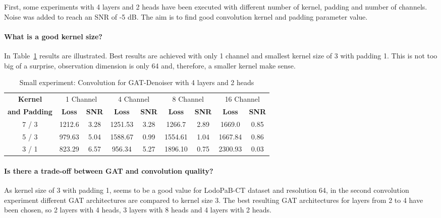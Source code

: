 First, some experiments with 4 layers and 2 heads have been executed with different number of kernel, padding and number of channels.
Noise was added to reach an SNR of -5 dB.
The aim is to find good convolution kernel and padding parameter value.

\paragraph{What is a good kernel size?}

In Table~\ref{tab:small_convolution} results are illustrated. 
Best results are achieved with only 1 channel and smallest kernel size of 3 with padding 1.
This is not too big of a surprise, observation dimension is only 64 and, therefore, a smaller kernel make sense.


\begin{table}[H]
  \centering
  \begin{tabular}{c|cc|cc|cc|cc}
    \toprule
    \textbf{Kernel}  & \multicolumn{2}{c|}{1 Channel} & \multicolumn{2}{c|}{4 Channel} & \multicolumn{2}{c|}{8 Channel} & \multicolumn{2}{c}{16 Channel} \\
    \textbf{and Padding}  & \textbf{Loss} & \textbf{SNR} & \textbf{Loss} & \textbf{SNR} & \textbf{Loss} & \textbf{SNR} & \textbf{Loss} & \textbf{SNR} \\ 
    \midrule
      7 / 3 & 1212.6 & 3.28 & 1251.53  &  3.28 &1266.7  & 2.89 & 1669.0  & 0.85 \\ \hline
      5 / 3 & 979.63 & 5.04 & 1588.67  &  0.99 &1554.61 & 1.04 & 1667.84 & 0.86 \\ \hline
      3 / 1 & 823.29 & 6.57 & 956.34   &  5.27 &1896.10 & 0.75 & 2300.93 & 0.03 \\

    \midrule
  \end{tabular}

  \caption{Small experiment: Convolution for GAT-Denoiser with 4 layers and 2 heads}
  \label{tab:small_convolution}
\end{table}

\paragraph{Is there a trade-off between GAT and convolution quality?}

As kernel size of 3 with padding 1, seems to be a good value for LodoPaB-CT dataset and resolution 64, 
in the second convolution experiment different GAT architectures are compared to kernel size 3.
The best resulting GAT architectures for layers from 2 to 4 have been chosen, so 2 layers with 4 heads, 3 layers with 8 heads
and 4 layers with 2 heads.

